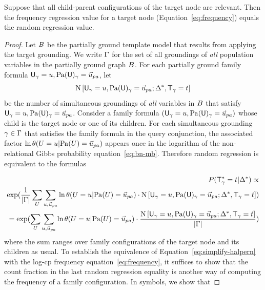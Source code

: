 \documentclass[twoside,11pt]{article}
\begin{document}
\begin{theorem}
Suppose that all child-parent configurations of the target node are relevant.  Then the frequency regression value  for a target node (Equation~\eqref{eq:frequency}) equals the random regression value. 
\end{theorem}

%

\begin{proof} Let $B$ be the partially ground template model that results from applying the target grounding. We write $\Gamma$ for the set of all groundings of {\em all} population variables in the partially ground graph $B$.
\newcommand{\BigCvar}{\mathrm{N}}
\newcommand{\BigCount}[2]{\BigCvar\left[#1;#2\right]}
For each partially ground family formula $\Appendterm{\Ground{\UI}  = \UV} {\Ground{\Pa{\UI}} = \Prange{\UT}}$, let $$\BigCount{\Appendterm{\Ground{\UI}  = \UV} {\Ground{\Pa{\UI}} = \Prange{\UT}}} {\QC,\Ground{\TI} = \TV}$$ be the number of simultaneous groundings of {\em all} variables in $B$ that satisfy $\Appendterm{\Ground{\UI}  = \UV} {\Ground{\Pa{\UI}} = \Prange{\UT}}$. 
Consider a family formula $(\Appendterm{\Ground{\UI}  = \UV} {\Ground{\Pa{\UI}} = \Prange{\UT}})$ whose child is the target node or one of its children. For each simultaneous grounding $\gamma \in \Gamma$ that satisfies the family formula  in the query conjunction, the associated factor $\ln \cprob{\UT = \UV}{\Pa{\UT} = \Prange{\UT}}$ appears once in the logarithm of the non-relational Gibbs probability equation~\ref{eq:bn-mb}. Therefore  random regression is equivalent to the formulas

\begin{eqnarray} 
\Gprob{\FG{\Ground{\TI}} = \TV} {\QC} \propto \nonumber \\\exp (\frac{1}{|\groundall|} \sum_{\UT} \sum_{\UV,\Prange{\UT}} \ln \cprob{\UT = \UV}{\Pa{\UT} = \Prange{\UT}} \cdot \BigCount{\Appendterm{\Ground{\UI}  = \UV} {\Ground{\Pa{\UI}} = \Prange{\UT}}} {\QC,\Ground{\TI} = \TV}) \label{eq:simplify-halpern}\\
= \exp (\sum_{\UT} \sum_{\UV,\Prange{\UT}}  \ln \cprob{\UT = \UV}{\Pa{\UT} = \Prange{\UT}} \cdot \frac{\BigCount{\Appendterm{\Ground{\UI}  = \UV} {\Ground{\Pa{\UI}} = \Prange{\UT}}} {\QC,\Ground{\TI} = \TV}}{|\groundall|})   \nonumber
\end{eqnarray}
where the sum ranges over family configurations of the target node and its children as usual. To establish the equivalence of Equation~\eqref{eq:simplify-halpern} with the log-cp frequency equation~\eqref{eq:frequency}, it suffices to show that the count fraction in the last random regression equality is another way of computing the frequency of a family configuration. In symbols, we show that


\end{proof}
\end{document}

